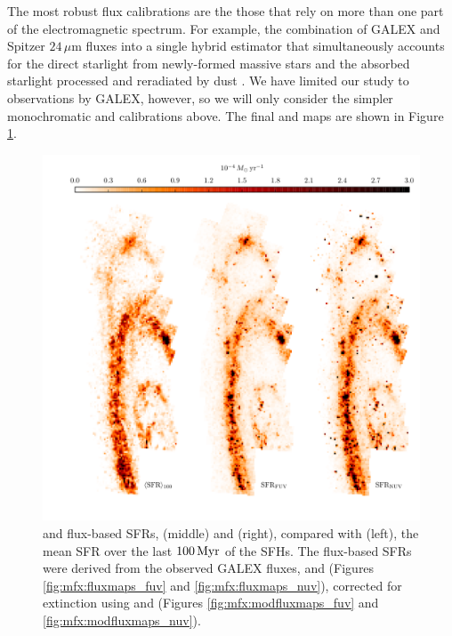 The most robust flux calibrations are the those that rely on more than one part
of the electromagnetic spectrum. For example, the combination of GALEX \fuv{}
and Spitzer $24\,\mu\mathrm{m}$ fluxes into a single hybrid estimator that
simultaneously accounts for the direct starlight from newly-formed massive
stars and the absorbed starlight processed and reradiated by dust
\citep[e.g.,][]{Leroy:2012}. We have limited our study to observations by
GALEX, however, so we will only consider the simpler monochromatic \fuv{} and
\nuv{} calibrations above. The final \sfrfuv{} and \sfrnuv{} maps are shown in
Figure \ref{fig:mfx:sfrmaps1}.


\begin{figure}
\centering
\includegraphics[width=\textwidth]{m31flux-figures/sfrmaps1.pdf}
\caption[SFR maps from estimates based on observed fluxes compared with the
    mean SFR map from the SFHs.]{\fuv{} and \nuv{} flux-based SFRs, \sfrfuv{}
    (middle) and \sfrnuv{} (right), compared with \sfroneh{} (left), the mean
    SFR over the last $100\,\mathrm{Myr}$ of the SFHs. The flux-based SFRs were derived
    from the observed GALEX fluxes, \fuvobs{} and \nuvobs{} (Figures
    \ref{fig:mfx:fluxmaps_fuv} and \ref{fig:mfx:fluxmaps_nuv}), corrected for
    extinction using \afuv{} and \anuv{} (Figures \ref{fig:mfx:modfluxmaps_fuv}
    and \ref{fig:mfx:modfluxmaps_nuv}).
}
\label{fig:mfx:sfrmaps1}
\end{figure}



